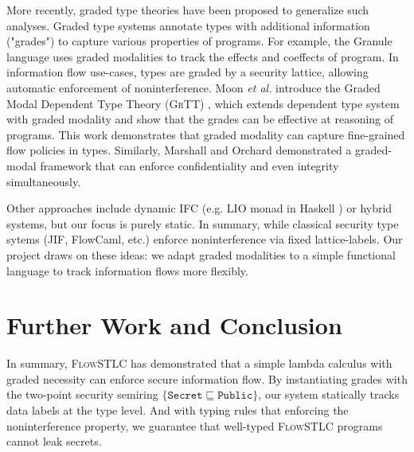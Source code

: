 \documentclass[conference]{IEEEtran}
\newcommand\public{\texttt{Public}}
\newcommand\secret{\texttt{Secret}}
\begin{document}
More recently, graded type theories have been proposed to generalize such analyses. Graded type systems annotate types with additional information ("grades") to capture various properties of programs. For example, the Granule language \cite{orchard2019quantitative} uses graded modalities to track the effects and coeffects of program. In information flow use-cases, types are graded by a security lattice, allowing automatic enforcement of noninterference. Moon \emph{et al.} introduce the Graded Modal Dependent Type Theory (\textsc{GrTT}) \cite{moon2021graded}, which extends dependent type system with graded modality and show that the grades can be effective at reasoning of programs. This work demonstrates that graded modality can capture fine-grained flow policies in types. Similarly, Marshall and Orchard  demonstrated a graded-modal framework that can enforce confidentiality and even integrity simultaneously.

Other approaches include dynamic IFC (e.g. LIO monad in Haskell \cite{stefan2011flexible}) or hybrid systems, but our focus is purely static. In summary, while classical security type sytems (JIF, FlowCaml, etc.) enforce noninterference via fixed lattice-labels. Our project draws on these ideas: we adapt graded modalities to a simple functional language to track information flows more flexibly.

\section{Further Work and Conclusion}

In summary, \textsc{FlowSTLC} has demonstrated that a simple lambda calculus with graded necessity can enforce secure information flow. By instantiating grades with the two-point security semiring $\{\secret\sqsubseteq\public\}$, our system statically tracks data labels at the type level. And with typing rules that enforcing the noninterference property, we guarantee that well-typed \textsc{FlowSTLC} programs cannot leak secrets. 
\end{document}
